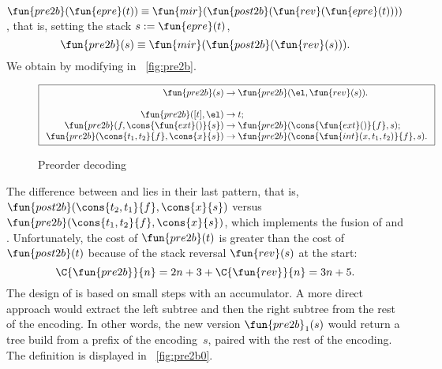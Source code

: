 \(\fun{pre2b}(\fun{epre}(t)) \equiv
\fun{mir}(\fun{post2b}(\fun{rev}(\fun{epre}(t))))\), that is, setting
the stack \(s := \fun{epre}(t)\),
\begin{equation*}
\abovedisplayskip=7pt
\belowdisplayskip=7pt
\fun{pre2b}(s) \equiv \fun{mir}(\fun{post2b}(\fun{rev}(s))).
\end{equation*}
We obtain  by modifying
 in \fig~\vref{fig:pre2b}.
\begin{figure}
\begin{equation*}
\boxed{
\begin{array}{r@{\;}c@{\;}l}
\fun{pre2b}(s) & \rightarrow & \fun{pre2b}(\el,\fun{rev}(s)).\\
\\
\fun{pre2b}([t],\el) & \rightarrow & t;\\
\fun{pre2b}(f,\cons{\fun{ext}()}{s}) & \rightarrow & \fun{pre2b}(\cons{\fun{ext}()}{f},s);\\
\fun{pre2b}(\cons{t_1,t_2}{f},\cons{x}{s}) & \rightarrow &
\fun{pre2b}(\cons{\fun{int}(x,t_1,t_2)}{f},s).
\end{array}}
\end{equation*}
\caption{Preorder decoding}
\label{fig:pre2b}
\end{figure}
The difference between  and
 lies in their last
pattern, that is, \(\fun{post2b}(\cons{t_2,t_1}{f},\cons{x}{s})\)
versus \(\fun{pre2b}(\cons{t_1,t_2}{f},\cons{x}{s})\), which
implements the fusion of  and
. Unfortunately, the cost of \(\fun{pre2b}(t)\)
 is greater than the cost of
\(\fun{post2b}(t)\) because of the stack reversal \(\fun{rev}(s)\) at
the start:
\begin{equation*}
  \C{\fun{pre2b}}{n} = 2n + 3 + \C{\fun{rev}}{n} = 3n + 5.
  \index{pre2b@$\C{\fun{pre2b}}{n}$}\index{rev@$\C{\fun{rev}}{n}$}
\end{equation*}
The design of  is based on
small steps with an accumulator. A more direct approach would extract
the left subtree and then the right subtree from the rest of the
encoding. In other words, the new version
\(\fun{pre2b}_1(s)\) would return a
tree build from a prefix of the encoding~\(s\), paired with the rest
of the encoding. The definition is displayed in
\fig~\vref{fig:pre2b0}.
